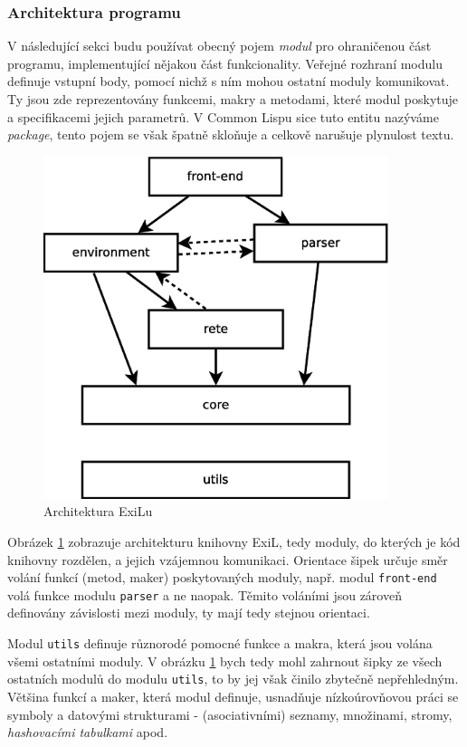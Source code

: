 \subsubsection{Architektura programu}

V následující sekci budu používat obecný pojem \emph{modul} pro ohraničenou část
programu, implementující nějakou část funkcionality. Veřejné rozhraní modulu
definuje vstupní body, pomocí nichž s ním mohou ostatní moduly komunikovat.
Ty jsou zde reprezentovány funkcemi, makry a metodami, které modul poskytuje
a specifikacemi jejich parametrů. V Common Lispu sice tuto entitu nazýváme
\emph{package}, tento pojem se však špatně skloňuje a celkově narušuje plynulost
textu.

\begin{figure}[h]
\centering
\includegraphics[height=10cm]{modules.eps}
\caption{Architektura ExiLu}
\label{modules}
\end{figure}

Obrázek \ref{modules} zobrazuje architekturu knihovny ExiL, tedy moduly, do
kterých je kód knihovny rozdělen, a jejich vzájemnou komunikaci. Orientace šipek
určuje směr volání funkcí (metod, maker) poskytovaných moduly, např. modul
\verb|front-end| volá funkce modulu \verb|parser| a ne naopak. Těmito voláními
jsou zároveň definovány závislosti mezi moduly, ty mají tedy stejnou orientaci.

Modul \verb|utils| definuje různorodé pomocné funkce a makra, která jsou volána
všemi ostatními moduly. V obrázku \ref{modules} bych tedy mohl zahrnout šipky ze
všech ostatních modulů do modulu \verb|utils|, to by jej však činilo zbytečně
nepřehledným. Většina funkcí a maker, která modul definuje, usnadňuje
nízkoúrovňovou práci se symboly a datovými strukturami - (asociativními)
seznamy, množinami, stromy, \emph{hashovacími tabulkami} apod.

